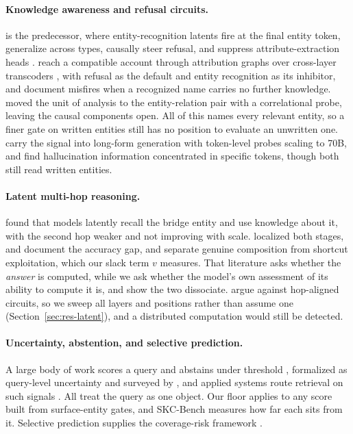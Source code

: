 \documentclass{article}
\begin{document}
\paragraph{Knowledge awareness and refusal circuits.} \citet{ferrando2025entity} is the predecessor,
where entity-recognition latents fire at the final entity token, generalize across types, causally
steer refusal, and suppress attribute-extraction heads \citep{geva2023dissecting,nanda2023factfinding}.
\citet{lindsey2025biology} reach a compatible account through attribution graphs over cross-layer
transcoders \citep{ameisen2025circuittracing,marks2025sparsecircuits}, with refusal as the default and
entity recognition as its inhibitor, and document misfires when a recognized name carries no further
knowledge. \citet{tamoyan2025factual} moved the unit of analysis to the entity-relation pair with a
correlational probe, leaving the causal components open. All of this names every relevant entity, so
a finer gate on written entities still has no position to evaluate an unwritten one.
\citet{obeso2025realtime} carry the signal into long-form generation with token-level probes scaling
to 70B, and \citet{orgad2025intrinsic} find hallucination information concentrated in specific
tokens, though both still read written entities.

\paragraph{Latent multi-hop reasoning.} \citet{yang2024latent} found that models latently recall the
bridge entity and use knowledge about it, with the second hop weaker and not improving with scale.
\citet{biran2024hopping} localized both stages, \citet{balesni2024twohop} and
\citet{press2023compositionality} document the accuracy gap, and \citet{yang2024shortcuts} separate
genuine composition from shortcut exploitation, which our slack term $v$ measures. That literature
asks whether the \emph{answer} is computed, while we ask whether the model's own assessment of its
ability to compute it is, and show the two dissociate. \citet{layerorder2026} argue against
hop-aligned circuits, so we sweep all layers and positions rather than assume one
(Section~\ref{sec:res-latent}), and a distributed computation would still be detected.

\paragraph{Uncertainty, abstention, and selective prediction.} A large body of work scores a query and
abstains under threshold
\citep{kadavath2022know,azaria2023internal,burns2023discovering,chen2024inside,ji2024internal,gottesman2024estimating,kossen2024semantic},
formalized as query-level uncertainty \citep{chen2026querylevel} and surveyed by
\citet{wen2025abstention}, and applied systems route retrieval on such signals \citep{yao2025seakr}.
All treat the query as one object. Our floor applies to any score built from surface-entity gates, and
SKC-Bench measures how far each sits from it. Selective prediction supplies the coverage-risk
framework \citep{elyaniv2010foundations,geifman2017selective}.
\end{document}
